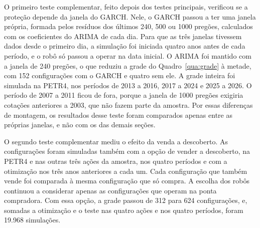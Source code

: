 O primeiro teste complementar, feito depois dos testes principais, verificou se a
proteção depende da janela do GARCH. Nele, o GARCH passou a ter uma janela
própria, formada pelos resíduos dos últimos 240, 500 ou 1000 pregões, calculados
com os coeficientes do ARIMA de cada dia. Para que as três janelas tivessem dados
desde o primeiro dia, a simulação foi iniciada quatro anos antes de cada período,
e o robô só passou a operar na data inicial. O ARIMA foi mantido com a janela de
240 pregões, o que reduziu a grade do Quadro~\ref{qua:grade} à metade, com 152
configurações com o GARCH e quatro sem ele. A grade inteira foi simulada na PETR4,
nos períodos de 2013 a 2016, 2017 a 2024 e 2025 a 2026. O período de 2007 a 2011
ficou de fora, porque a janela de 1000 pregões exigiria cotações anteriores a
2003, que não fazem parte da amostra. Por essas diferenças de montagem, os
resultados desse teste foram comparados apenas entre as próprias janelas, e não
com os das demais seções.

O segundo teste complementar mediu o efeito da venda a descoberto. As
configurações foram simuladas também com a opção de vender a descoberto, na PETR4 e nas outras três ações da amostra,
nos quatro períodos e com a otimização nos três anos anteriores a cada um. Cada
configuração que também vende foi comparada à mesma configuração que só compra. A
escolha dos robôs continuou a considerar apenas as configurações que operam na
ponta compradora. Com essa opção, a grade passou de 312 para 624 configurações, e,
somadas a otimização e o teste nas quatro ações e nos quatro períodos, foram
19.968 simulações.

